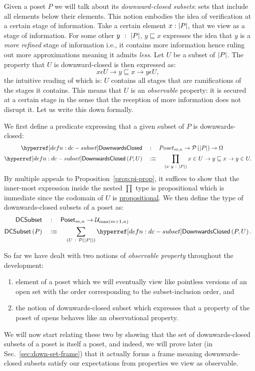 Given a poset $P$ we will talk about its \emph{downward-closed subsets}: sets that include
all elements below their elements. This notion embodies the idea of verification at a
certain stage of information. Take a certain element $x : \left| P \right|$, that we view as a
stage of information. For some other $y~:~\left| P \right|$, $y \sqsubseteq x$ expresses the idea that $y$ is
a \emph{more refined} stage of information i.e., it contains more information hence ruling
out more approximations meaning it admits \emph{less}. Let $U$ be a subset of $\left| P \right|$.
The property that $U$ is downward-closed is then expressed as:
\begin{equation*}
  x \epsilon U \rightarrow y \sqsubseteq x \rightarrow y \epsilon U,
\end{equation*}
the intuitive reading of which is: $U$ contains all stages that are ramifications of the
stages it contains. This means that $U$ is an \emph{observable} property: it is secured at
a certain stage in the sense that the reception of more information does not disrupt it.
Let us write this down formally.
\begin{defn}\label{defn:dc-subset}
  We first define a predicate expressing that a given subset of $P$ is downwards-closed:
  \begin{align*}
    \isdcnm{}   &\quad:\quad  Poset_{m, n} \rightarrow \pow{\abs{P}} \rightarrow \Omega\\
    \isdc{P, U} &\quad\is{}\quad \pity{x~y}{\abs{P}}{x \in U \rightarrow y \sqsubseteq x \rightarrow y \in U}.
  \end{align*}
  By multiple appeals to Proposition~\ref{prop:pi-prop}, it suffices to show that the
  inner-most expression inside the nested $\prod$ type is propositional which is immediate
  since the codomain of $U$ is \hyperref[defn:hprop]{propositional}. We then define the
  type of downwards-closed subsets of a poset as:
  \begin{align*}
    \dcsubsetnm{} &\quad:\quad \mathsf{Poset}_{m, n} \rightarrow \univ_{\max(m+1, n)}\\
    \dcsubset{P}  &\quad\is{}\quad \sigmaty{U}{\pow{\abs{P}}}{\isdc{P, U}}.
  \end{align*}
\end{defn}

So far we have dealt with two notions of \emph{observable property} throughout the
development:
\begin{enumerate}
  \item element of a poset which we will eventually view like pointless versions of an
    open set with the order corresponding to the subset-inclusion order, and
  \item the notion of downwards-closed subset which expresses that a property of the poset
    of opens behaves like an observational property.
\end{enumerate}
We will now start relating these two by showing that the set of downwards-closed subsets
of a poset is itself a poset, and indeed, we will prove later (in
Sec.~\ref{sec:down-set-frame}) that it actually forms a frame meaning downwards-closed
subsets satisfy our expectations from properties we view as observable.

